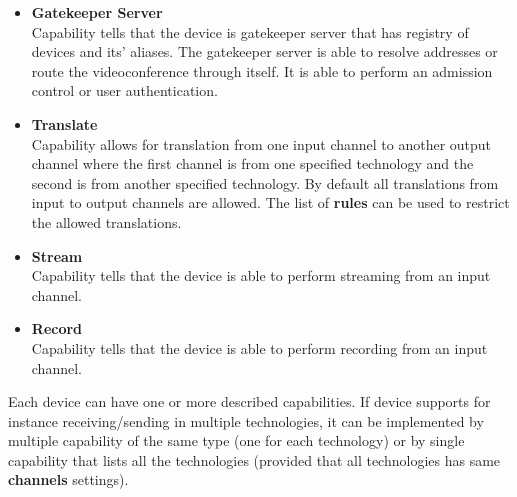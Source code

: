 \documentclass[a4paper]{report}
\newcommand{\TODO}[1]{%
\def\empty{}%
\def\prvniparametr{#1}%
\ifx\prvniparametr\empty%
\begingroup\tt\textcolor{red}{\noindent\textbf{TODO}}\endgroup
\else%
\begingroup\tt\textcolor{red}{\noindent\textbf{TODO:}\ #1}\endgroup
\fi%
}
\begin{document}
\begin{itemize}
\TODO{Remove the gatekeeper description of translation and routing and describe rather the reacheability.}

\item \textbf{Gatekeeper Server} \\
  Capability tells that the device is gatekeeper server
  that has registry of devices and its' aliases. The gatekeeper server is
  able to resolve addresses or route the videoconference through itself. It is 
  able to perform an admission control or user authentication.

\item \textbf{Translate}  \\
  Capability allows for translation from one input channel to another output 
  channel where the first channel is from one specified technology and the 
  second is from another specified technology. By default all translations from 
  input to output channels are allowed. The list of \textbf{rules} can be used 
  to restrict the allowed translations.

\item \textbf{Stream}  \\
  Capability tells that the device is able to perform streaming from an input 
  channel.

\item \textbf{Record}  \\
  Capability tells that the device is able to perform recording from an input 
  channel.
\end{itemize}

Each device can have one or more described capabilities. If device supports 
for instance receiving/sending in multiple technologies, it can be implemented 
by multiple capability of the same type (one for each technology) or by single 
capability that lists all the technologies (provided that all technologies has same \textbf{channels} settings).
\end{document}

